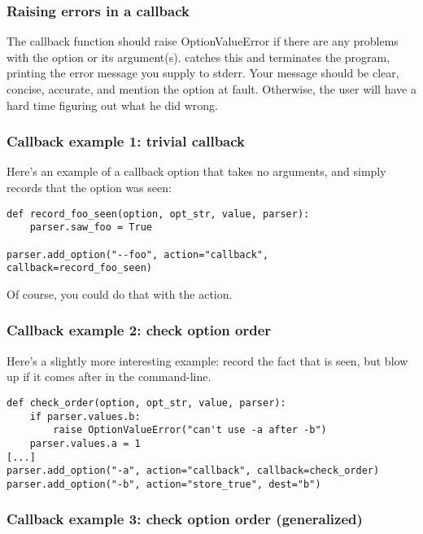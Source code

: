 \subsubsection{Raising errors in a callback\label{optparse-raising-errors-in-callback}}

The callback function should raise OptionValueError if there are any
problems with the option or its argument(s).   catches this and
terminates the program, printing the error message you supply to
stderr.  Your message should be clear, concise, accurate, and mention
the option at fault.  Otherwise, the user will have a hard time
figuring out what he did wrong.


\subsubsection{Callback example 1: trivial callback\label{optparse-callback-example-1}}

Here's an example of a callback option that takes no arguments, and
simply records that the option was seen:
\begin{verbatim}
def record_foo_seen(option, opt_str, value, parser):
    parser.saw_foo = True

parser.add_option("--foo", action="callback", callback=record_foo_seen)
\end{verbatim}

Of course, you could do that with the  action.


\subsubsection{Callback example 2: check option order\label{optparse-callback-example-2}}

Here's a slightly more interesting example: record the fact that
 is seen, but blow up if it comes after  in the
command-line.
\begin{verbatim}
def check_order(option, opt_str, value, parser):
    if parser.values.b:
        raise OptionValueError("can't use -a after -b")
    parser.values.a = 1
[...]
parser.add_option("-a", action="callback", callback=check_order)
parser.add_option("-b", action="store_true", dest="b")
\end{verbatim}


\subsubsection{Callback example 3: check option order (generalized)\label{optparse-callback-example-3}}

